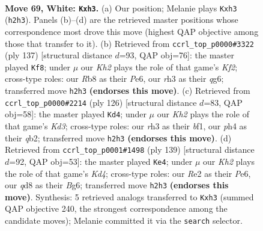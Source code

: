 \documentclass[11pt]{article}
\begin{document}
\clearpage

\begin{figure}[p]\centering
\begin{subfigure}{0.46\textwidth}\centering
\resizebox{\linewidth}{!}{%
\newchessgame
\chessboard[
  setfen={1R1q1kr1/6b1/6Q1/6P1/3P1P1p/7r/4R2K/8 w - - 0 69},
  showmover=false,
  pgfstyle=straightmove, color=movearrow, markmove={h2-h3}
]}
\caption{}
\end{subfigure}\hfill
\begin{subfigure}{0.46\textwidth}\centering
\resizebox{\linewidth}{!}{%
\newchessgame
\chessboard[
  setfen={8/5k2/4p1Q1/4qp1P/8/5B2/2r2BK1/8 b - - 18 69},
  showmover=false,
  pgfstyle=straightmove, color=movearrow, markmove={f7-f8}
]}
\caption{}
\end{subfigure}
\\[4pt]
\begin{subfigure}{0.46\textwidth}\centering
\resizebox{\linewidth}{!}{%
\newchessgame
\chessboard[
  setfen={8/8/8/6Q1/P5p1/1PRKBrk1/1q6/5b2 w - - 3 64},
  showmover=false,
  pgfstyle=straightmove, color=movearrow, markmove={d3-d4}
]}
\caption{}
\end{subfigure}\hfill
\begin{subfigure}{0.46\textwidth}\centering
\resizebox{\linewidth}{!}{%
\newchessgame
\chessboard[
  setfen={8/5p2/4p1b1/1R1kP3/8/1KR5/1B6/1rq5 b - - 0 70},
  showmover=false,
  pgfstyle=straightmove, color=movearrow, markmove={d5-e4}
]}
\caption{}
\end{subfigure}
\caption{\textbf{Move 69, White: \texttt{Kxh3}.} (a) Our position; Melanie plays \texttt{Kxh3} (\texttt{h2h3}). Panels (b)--(d) are the retrieved master positions whose correspondence most drove this move (highest QAP objective among those that transfer to it). (b) Retrieved from \texttt{ccrl\_top\_p0000\#3322} (ply 137) [structural distance $d$=93, QAP obj=76]: the master played \texttt{Kf8}; under $\mu$ our \emph{Kh2} plays the role of that game's \emph{Kf2}; cross-type roles: our \emph{R}b8 as their \emph{P}e6, our \emph{r}h3 as their \emph{q}g6; transferred move \texttt{h2h3} \textbf{(endorses this move)}. (c) Retrieved from \texttt{ccrl\_top\_p0000\#2214} (ply 126) [structural distance $d$=83, QAP obj=58]: the master played \texttt{Kd4}; under $\mu$ our \emph{Kh2} plays the role of that game's \emph{Kd3}; cross-type roles: our \emph{r}h3 as their \emph{b}f1, our \emph{p}h4 as their \emph{q}b2; transferred move \texttt{h2h3} \textbf{(endorses this move)}. (d) Retrieved from \texttt{ccrl\_top\_p0001\#1498} (ply 139) [structural distance $d$=92, QAP obj=53]: the master played \texttt{Ke4}; under $\mu$ our \emph{Kh2} plays the role of that game's \emph{Kd4}; cross-type roles: our \emph{R}e2 as their \emph{P}e6, our \emph{q}d8 as their \emph{B}g6; transferred move \texttt{h2h3} \textbf{(endorses this move)}. Synthesis: 5 retrieved analogs transferred to \texttt{Kxh3} (summed QAP objective 240, the strongest correspondence among the candidate moves); Melanie committed it via the \texttt{search} selector.}
\label{fig:thought-m136}
\end{figure}
\end{document}
